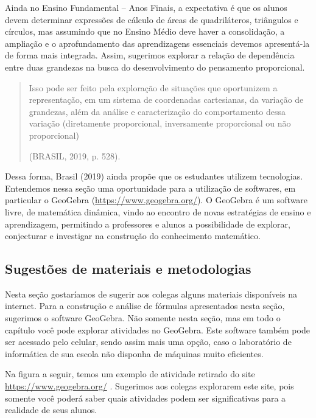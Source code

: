 \begin{paginatexto}
Ainda no Ensino Fundamental – Anos Finais, a expectativa é que os alunos devem determinar expressões de cálculo de áreas de quadriláteros, triângulos e círculos, mas assumindo que no Ensino Médio deve haver a consolidação, a ampliação e o aprofundamento das aprendizagens essenciais devemos apresentá-la de forma mais integrada. Assim, sugerimos explorar a relação de dependência entre duas grandezas na busca do desenvolvimento do pensamento proporcional.

\begin{quote}
  Isso pode ser feito pela exploração de situações que oportunizem a representação, em um sistema de coordenadas cartesianas, da variação de grandezas, além da análise e caracterização do comportamento dessa variação (diretamente proporcional, inversamente proporcional ou não proporcional)

  \flushright
  (BRASIL, 2019, p. 528).
 \end{quote}

Dessa forma, Brasil (2019) ainda propõe que os estudantes utilizem tecnologias. Entendemos nessa seção uma oportunidade para a utilização de softwares, em particular o GeoGebra (\url{https://www.geogebra.org/}). O GeoGebra é um software livre, de matemática dinâmica, vindo ao encontro de novas estratégias de ensino e aprendizagem, permitindo a professores e alunos a possibilidade de explorar, conjecturar e investigar na construção do conhecimento matemático.

\subsection{Sugestões de materiais e metodologias}

Nesta seção gostaríamos de sugerir aos colegas alguns materiais disponíveis na internet. Para a construção e análise de fórmulas apresentados nesta seção, sugerimos o software GeoGebra. Não somente nesta seção, mas em todo o capítulo você pode explorar atividades no GeoGebra. Este software também pode ser acessado pelo celular, sendo assim mais uma opção, caso o laboratório de informática de sua escola não disponha de máquinas muito eficientes.

Na figura a seguir, temos um exemplo de atividade retirado do site \url{https://www.geogebra.org/} . Sugerimos aos colegas explorarem este site, pois somente você poderá saber quais atividades podem ser significativas para a realidade de seus alunos. 

\begin{figure}[H]
\centering


\end{figure}
\end{paginatexto}
